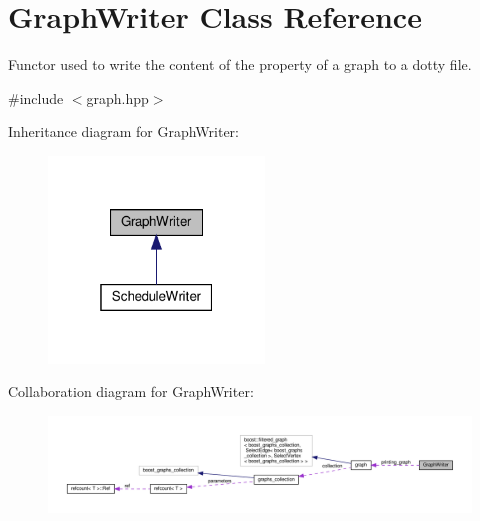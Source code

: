 \hypertarget{classGraphWriter}{}\section{Graph\+Writer Class Reference}
\label{classGraphWriter}


Functor used to write the content of the property of a graph to a dotty file.  




{\ttfamily \#include $<$graph.\+hpp$>$}



Inheritance diagram for Graph\+Writer\+:
\nopagebreak
\begin{figure}[H]
\begin{center}
\leavevmode
\includegraphics[width=163pt]{d7/d15/classGraphWriter__inherit__graph}
\end{center}
\end{figure}


Collaboration diagram for Graph\+Writer\+:
\nopagebreak
\begin{figure}[H]
\begin{center}
\leavevmode
\includegraphics[width=350pt]{de/d6b/classGraphWriter__coll__graph}
\end{center}
\end{figure}
